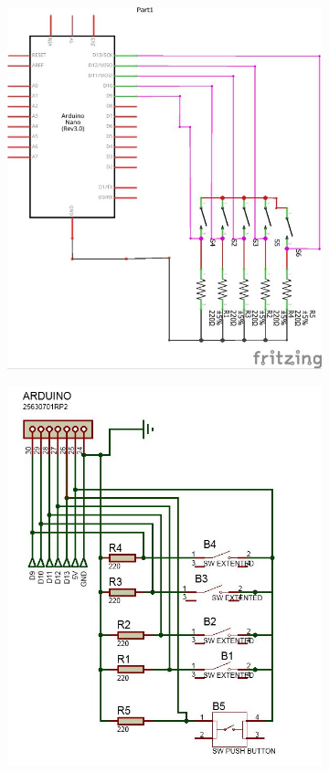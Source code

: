 \begin{figure}[!htbp]
    \centering
    \begin{subfigure}[t]{.45\linewidth}
        \centering
        \includegraphics[width=\textwidth]{assets/conception1/img71.jpg}
    \end{subfigure}
    \hfill
    \begin{subfigure}[t]{.45\linewidth}
        \centering
        \includegraphics[width=\textwidth]{assets/conception1/img73.jpg}

\end{subfigure}
\end{figure}
